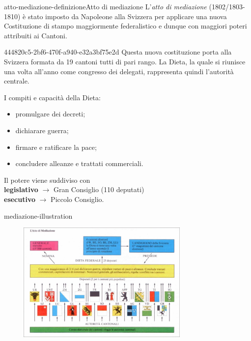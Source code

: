 \documentclass[preview]{standalone}
\begin{document}
\begin{snippetdefinition}{atto-mediazione-definizione}{Atto di mediazione}
    L'\textit{atto di mediazione} (1802/1803-1810) è stato imposto da Napoleone alla Svizzera per
    applicare una nuova Costituzione di stampo maggiormente federalistico e
    dunque con maggiori poteri attribuiti ai Cantoni.
\end{snippetdefinition}

\begin{snippet}{444820c5-2bf6-470f-a940-e32a3bf75e2d}
    Questa nuova costituzione porta alla Svizzera formata da 19 cantoni tutti di pari rango.
    La Dieta, la quale si riunisce una volta all'anno come congresso dei delegati,
    rappresenta quindi l'autorità centrale.

    I compiti e capacità della Dieta:
    \begin{itemize}
        \item promulgare dei decreti;
        \item dichiarare guerra;
        \item firmare e ratificare la pace;
        \item concludere alleanze e trattati commerciali.
    \end{itemize}

    Il potere viene suddiviso con \\
    \textbf{legislativo} \(\rightarrow\) Gran Consiglio (110 deputati) \\
    \textbf{esecutivo} \(\rightarrow\) Piccolo Consiglio.
\end{snippet}

\begin{snippet}{mediazione-illustration}
    \begin{center}
    \begin{figure}[h]
        \centering
        \includegraphics[width=0.75\textwidth]{./resources/mediazione.png}
    \end{figure}
    \end{center}
\end{snippet}
\end{document}
